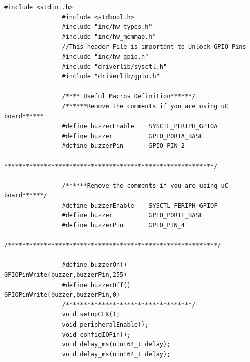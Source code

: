 \documentclass[a4paper,10pt,oneside]{article}
\begin{document}
			\begin{lstlisting}[style=CStyle]
				#include <stdint.h>
				#include <stdbool.h>
				#include "inc/hw_types.h"
				#include "inc/hw_memmap.h"
				//This header File is important to Unlock GPIO Pins
				#include "inc/hw_gpio.h"
				#include "driverlib/sysctl.h"
				#include "driverlib/gpio.h"
				
				/**** Useful Macros Definition******/
				/******Remove the comments if you are using uC board******
				#define buzzerEnable    SYSCTL_PERIPH_GPIOA
				#define buzzer          GPIO_PORTA_BASE
				#define buzzerPin       GPIO_PIN_2
				**********************************************************/
				
				/******Remove the comments if you are using uC board******/
				#define buzzerEnable    SYSCTL_PERIPH_GPIOF
				#define buzzer          GPIO_PORTF_BASE
				#define buzzerPin       GPIO_PIN_4
				/**********************************************************/
				
				#define buzzerOn()      GPIOPinWrite(buzzer,buzzerPin,255)
				#define buzzerOff()     GPIOPinWrite(buzzer,buzzerPin,0)
				/***********************************/
				void setupCLK();
				void peripheralEnable();
				void configIOPin();
				void delay_ms(uint64_t delay);
				void delay_ms(uint64_t delay);
				

\end{lstlisting}
\end{document}
